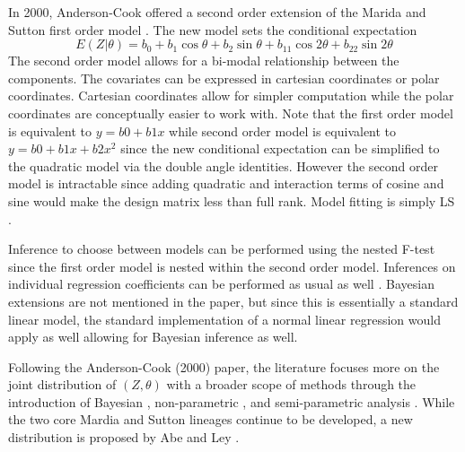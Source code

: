 In 2000, Anderson-Cook offered a second order extension of the Marida and Sutton first order model \cite{anderson-cook_second_2000} \cite{mardia_model_1978}. The new model sets the conditional expectation \[E(Z |\theta) = b_0 + b_1 \cos\theta + b_2\sin\theta + b_{11}\cos2\theta + b_{22}\sin2\theta\] The second order model allows for a bi-modal relationship between the components. The covariates can be expressed in cartesian coordinates or polar coordinates. Cartesian coordinates allow for simpler computation while the polar coordinates are conceptually easier to work with. Note that the first order model is equivalent to $y = b0 + b1 x$ while second order model is equivalent to $y = b0 + b1 x + b2 x^2$ since the new conditional expectation can be simplified to the quadratic model via the double angle identities. However the second order model is intractable since adding quadratic and interaction terms of cosine and sine would make the design matrix less than full rank. Model fitting is simply LS \cite{anderson-cook_second_2000}.

Inference to choose between models can be performed using the nested F-test since the first order model is nested within the second order model. Inferences on individual regression coefficients can be performed as usual as well \cite{anderson-cook_second_2000}. Bayesian extensions are not mentioned in the paper, but since this is essentially a standard linear model, the standard implementation of a normal linear regression would apply as well allowing for Bayesian inference as well.

Following the Anderson-Cook (2000) paper, the literature focuses more on the joint distribution of $(Z, \theta)$ with a broader scope of methods through the introduction of Bayesian \cite{sadeghianpourhamami_bayesian_2019}\cite{abe_tractable_2017}\cite{mulder_bayesian_2017}\cite{mastrantonio_joint_2018}, non-parametric \cite{carnicero_non-parametric_2013}\cite{garcia-portugues_exploring_2013}, and semi-parametric analysis \cite{fernandez-duran_models_2007}. While the two core Mardia and Sutton lineages continue to be developed, a new distribution is proposed by Abe and Ley \cite{abe_tractable_2017}.